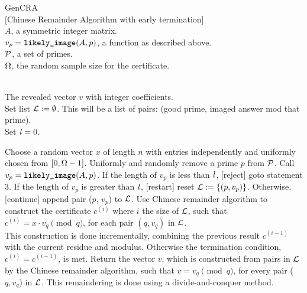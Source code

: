 \begin{algorithm} {GenCRA}\\
$[$Chinese Remainder Algorithm with early termination] 
\Inspec\\
  $A$, a symmetric integer matrix.\\
  $v_p = \mbox{\tt likely\_image}(A, p)$, a function as described above.\\
  $\mathcal P$, a set of primes.\\  %
  $\Omega$, the random sample size for the certificate.

\Outspec\\
The revealed vector $v$ with integer coefficients. \\
\Stmt[1.]
Set list $\mathcal L := \emptyset$.  This will be a list of pairs: (good prime, imaged answer
 mod that prime).\\
Set $\mathit l = 0$.

\Stmt[2.]
Choose a random vector $x$ of length $n$ with
entries independently and uniformly chosen 
from $[0, \Omega - 1]$.
\Stmt[3.]
Uniformly and randomly remove a prime $p$ from $\mathcal P$.
\Stmt[4.]
Call $v_p = \mbox{\tt likely\_image}(A, p)$. 
If the length of $v_p$ is less than $\mathit l$, [reject] goto statement 3.
If the length of $v_p$ is greater than $\mathit l$, [restart] reset $\mathcal L := \{(p, v_p)\}$.
Otherwise, [continue] append pair ($p$, $v_p$) to $\mathcal L$.
\Stmt[5.]
Use Chinese remainder algorithm to construct 
the certificate $c^{(i)}$ where $i$ the size of $\mathcal L$, such that
$c^{(i)} = x \cdot v_{q} \pmod {q}$, for each pair $(q, v_q)$ in $\mathcal L$.\\
This construction is done incrementally, combining the previous result $c^{(i-1)}$ 
with the current residue and modulus.
\Stmt[6.]
Otherwise the termination condition, $c^{(i)} = c^{(i-1)}$,
is met.
Return the vector $v$, which is
constructed from pairs in $\mathcal L$ by the Chinese remainder algorithm,
such that $v = v_q \pmod q$, for every pair ($q, v_q$) in $\mathcal L$.
This remaindering is done using a divide-and-conquer method. 
\end{algorithm}

